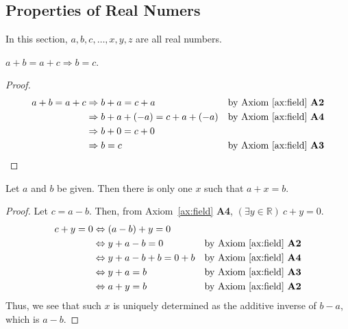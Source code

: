 \documentclass[../main.tex]{subfiles}
\begin{document}
\subsection{Properties of Real Numers}
In this section, $a, b, c, \dots, x, y, z$ are all real numbers.
\begin{thm}
    $a + b = a + c \Rightarrow b = c$.
\end{thm}
\begin{proof}
    \begin{align*}
        a + b = a + c &\Rightarrow b + a = c + a &\text{by Axiom~\ref{ax:field} \textbf{A2}}\\
                      &\Rightarrow b + a + (-a) = c + a + (-a) &\text{by Axiom~\ref{ax:field} \textbf{A4}}\\
                      &\Rightarrow b + 0 = c + 0\\
                      &\Rightarrow b = c &\text{by Axiom~\ref{ax:field} \textbf{A3}}
    \end{align*}
\end{proof}

\begin{thm}
    Let $a$ and $b$ be given. Then there is only one $x$ such that $a + x = b$.
\end{thm}
\begin{proof}
    Let $c = a - b$.
    Then, from Axiom~\ref{ax:field} \textbf{A4}, $(\exists y \in \mathbb{R})\ c + y = 0$.
    \begin{align*}
        c + y = 0 &\Leftrightarrow (a - b) + y = 0\\
                  &\Leftrightarrow y + a - b = 0 &\text{by Axiom~\ref{ax:field} \textbf{A2}}\\
                  &\Leftrightarrow y + a - b + b = 0 + b &\text{by Axiom~\ref{ax:field} \textbf{A4}}\\
                  &\Leftrightarrow y + a = b &\text{by Axiom~\ref{ax:field} \textbf{A3}}\\
                  &\Leftrightarrow a + y = b &\text{by Axiom~\ref{ax:field} \textbf{A2}}
    \end{align*}
    Thus, we see that such $x$ is uniquely determined as the additive inverse of $b-a$, which is $a - b$.
\end{proof}
\end{document}
